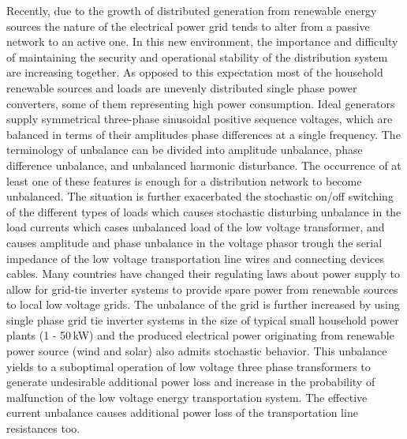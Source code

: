 
Recently, due to the growth of distributed generation from renewable energy sources the nature of the electrical power grid tends to alter from a passive network to an active one. In this new environment, the importance and difficulty of maintaining the security and operational stability of the distribution system are increasing together. As opposed to this expectation most of the household renewable sources and loads are unevenly distributed single phase power converters, some of them representing high power consumption. Ideal generators supply symmetrical three-phase sinusoidal positive sequence voltages, which are balanced in terms of their amplitudes phase differences at a single frequency. The terminology of unbalance can be divided into amplitude unbalance, phase difference unbalance, and unbalanced harmonic disturbance. The occurrence of at least one of these features is enough for a distribution network to become unbalanced. The situation is further exacerbated the stochastic on/off switching of the different types of loads which causes stochastic disturbing unbalance in the load currents which cases unbalanced load of the low voltage transformer, and causes amplitude and phase unbalance in the voltage phasor trough the serial impedance of the low voltage transportation line wires and connecting devices cables. Many countries have changed their regulating laws about power supply to allow for grid-tie inverter systems to provide spare power from renewable sources to local low voltage grids. The unbalance of the grid is further increased by using single phase grid tie inverter systems in the size of typical small household power plants (1 - 50\,kW) and the produced electrical power originating from renewable power source (wind and solar) also admits stochastic behavior. This unbalance yields to a suboptimal operation of low voltage three phase transformers to generate undesirable additional power loss and increase in the probability of malfunction of the low voltage energy transportation system. The effective current unbalance causes additional power loss of the transportation line resistances too.

